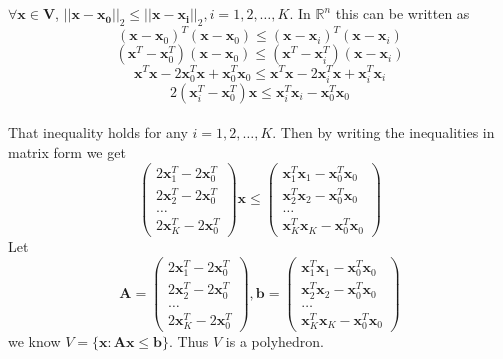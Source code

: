 \documentclass[12pt,letterpaper]{article}
\begin{document}
\section{}
$\forall\boldsymbol{x}\in\boldsymbol{V}$, $||\boldsymbol{x}-\boldsymbol{x_{0}}||_{2}\leq||\boldsymbol{x}-\boldsymbol{x_{i}}||_{2},i=1,2,\dots,K$. In $\mathbb{R}^n$ this can be written as $$(\boldsymbol{x}-\boldsymbol{x}_0)^{T}(\boldsymbol{x}-\boldsymbol{x}_0)\leq(\boldsymbol{x}-\boldsymbol{x}_i)^{T}(\boldsymbol{x}-\boldsymbol{x}_i)$$
$$(\boldsymbol{x}^T-\boldsymbol{x}^T_0)(\boldsymbol{x}-\boldsymbol{x}_0)\leq(\boldsymbol{x}^T-\boldsymbol{x}^T_i)(\boldsymbol{x}-\boldsymbol{x}_i)$$
$$\boldsymbol{x}^T\boldsymbol{x}-2\boldsymbol{x}^T_0\boldsymbol{x}+\boldsymbol{x}^T_0\boldsymbol{x}_0\leq\boldsymbol{x}^T\boldsymbol{x}-2\boldsymbol{x}^T_i\boldsymbol{x}+\boldsymbol{x}^T_i\boldsymbol{x}_i$$
$$2(\boldsymbol{x}_i^T-\boldsymbol{x}_0^T)\boldsymbol{x}\leq\boldsymbol{x}_i^T\boldsymbol{x}_i-\boldsymbol{x}_0^T\boldsymbol{x}_0$$\\
That inequality holds for any $i=1,2,\dots,K$. Then by writing the inequalities in matrix form we get 
$$
\begin{pmatrix}
2\boldsymbol{x}_1^T-2\boldsymbol{x}_0^T\\
2\boldsymbol{x}_2^T-2\boldsymbol{x}_0^T\\
\dots\\
2\boldsymbol{x}_K^T-2\boldsymbol{x}_0^T
\end{pmatrix}
\boldsymbol{x}\leq
\begin{pmatrix}
\boldsymbol{x}_1^T\boldsymbol{x}_1-\boldsymbol{x}_0^T\boldsymbol{x}_0\\
\boldsymbol{x}_2^T\boldsymbol{x}_2-\boldsymbol{x}_0^T\boldsymbol{x}_0\\
\dots\\
\boldsymbol{x}_K^T\boldsymbol{x}_K-\boldsymbol{x}_0^T\boldsymbol{x}_0
\end{pmatrix}
$$
Let 
$$
\boldsymbol{A}=\begin{pmatrix}
2\boldsymbol{x}_1^T-2\boldsymbol{x}_0^T\\
2\boldsymbol{x}_2^T-2\boldsymbol{x}_0^T\\
\dots\\
2\boldsymbol{x}_K^T-2\boldsymbol{x}_0^T
\end{pmatrix},\boldsymbol{b}=\begin{pmatrix}
\boldsymbol{x}_1^T\boldsymbol{x}_1-\boldsymbol{x}_0^T\boldsymbol{x}_0\\
\boldsymbol{x}_2^T\boldsymbol{x}_2-\boldsymbol{x}_0^T\boldsymbol{x}_0\\
\dots\\
\boldsymbol{x}_K^T\boldsymbol{x}_K-\boldsymbol{x}_0^T\boldsymbol{x}_0
\end{pmatrix}
$$
we know $V=\{\boldsymbol{x}:\boldsymbol{Ax}\leq\boldsymbol{b}\}$. Thus $V$ is a polyhedron.
\end{document}
